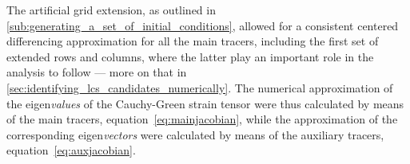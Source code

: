 
The artificial grid extension, as outlined in
\cref{sub:generating_a_set_of_initial_conditions}, allowed for a consistent
centered differencing approximation for all the main tracers, including the
first set of extended rows and columns, where the latter play an important
role in the analysis to follow --- more on that in
\cref{sec:identifying_lcs_candidates_numerically}. The numerical approximation
of the eigen\emph{values} of the Cauchy-Green strain tensor were thus calculated
by means of the main tracers, equation~\eqref{eq:mainjacobian}, while
the approximation of the corresponding eigen\emph{vectors} were calculated by
means of the auxiliary tracers, equation~\eqref{eq:auxjacobian}.
